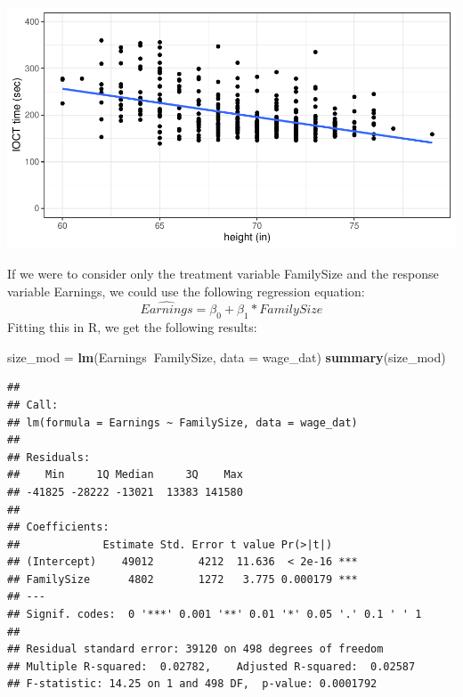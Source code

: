 \documentclass[]{book}
\newenvironment{Shaded}{\begin{snugshade}}{\end{snugshade}}
\newcommand{\DataTypeTok}[1]{\textcolor[rgb]{0.13,0.29,0.53}{#1}}
\newcommand{\KeywordTok}[1]{\textcolor[rgb]{0.13,0.29,0.53}{\textbf{#1}}}
\newcommand{\NormalTok}[1]{#1}
\newcommand{\OperatorTok}[1]{\textcolor[rgb]{0.81,0.36,0.00}{\textbf{#1}}}
\newcommand{\StringTok}[1]{\textcolor[rgb]{0.31,0.60,0.02}{#1}}
\begin{document}
\begin{Shaded}
\end{Shaded}

\includegraphics{MA206supplement_files/figure-latex/unnamed-chunk-16-1.pdf}

If we were to consider only the treatment variable FamilySize and the response variable Earnings, we could use the following regression equation:
\[\widehat{Earnings} = \beta_0+\beta_1*FamilySize\]
Fitting this in R, we get the following results:

\begin{Shaded}
\begin{Highlighting}[]
\NormalTok{size_mod =}\StringTok{ }\KeywordTok{lm}\NormalTok{(Earnings}\OperatorTok{~}\NormalTok{FamilySize, }\DataTypeTok{data =}\NormalTok{ wage_dat)}
\KeywordTok{summary}\NormalTok{(size_mod)}
\end{Highlighting}
\end{Shaded}

\begin{verbatim}
## 
## Call:
## lm(formula = Earnings ~ FamilySize, data = wage_dat)
## 
## Residuals:
##    Min     1Q Median     3Q    Max 
## -41825 -28222 -13021  13383 141580 
## 
## Coefficients:
##             Estimate Std. Error t value Pr(>|t|)    
## (Intercept)    49012       4212  11.636  < 2e-16 ***
## FamilySize      4802       1272   3.775 0.000179 ***
## ---
## Signif. codes:  0 '***' 0.001 '**' 0.01 '*' 0.05 '.' 0.1 ' ' 1
## 
## Residual standard error: 39120 on 498 degrees of freedom
## Multiple R-squared:  0.02782,    Adjusted R-squared:  0.02587 
## F-statistic: 14.25 on 1 and 498 DF,  p-value: 0.0001792
\end{verbatim}
\end{document}
